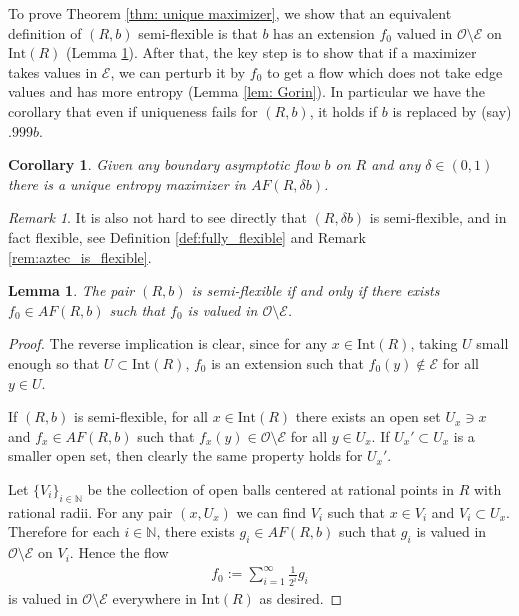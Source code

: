 \documentclass[11pt]{article}
\newtheorem{lemma}[thm]{Lemma}
\newtheorem{cor}[thm]{Corollary}
\theoremstyle{remark}
\newtheorem{rem}[thm]{Remark}
\theoremstyle{definition}
\newcommand{\mc}[1]{\mathcal{#1}}
\newcommand{\m}[1]{\mathbb{#1}}
\begin{document}
To prove Theorem \ref{thm: unique maximizer}, we show that an equivalent definition of $(R,b)$ {semi-flexible} is that $b$ has an extension $f_0$ valued in $\mc O\setminus \mc E$ on $\text{Int}(R)$ (Lemma \ref{lem: nonwhere edge extension}). After that, the key step is to show that if a maximizer takes values in $\mc E$, we can perturb it by $f_0$ to get a flow which does not take edge values and has more entropy (Lemma \ref{lem: Gorin}). In particular we have the corollary that even if uniqueness fails for $(R,b)$, it holds if $b$ is replaced by (say) $.999b$.
\begin{cor}
Given any boundary asymptotic flow $b$ on $R$ and any $\delta\in (0,1)$ there is a unique entropy maximizer in $AF(R, \delta b)$.
\end{cor}
\begin{rem}\label{rem:aztec_is_semiflexible}
    It is also not hard to see directly that $(R,\delta b)$ is semi-flexible, and in fact flexible, see Definition \ref{def:fully_flexible} and Remark \ref{rem:aztec_is_flexible}. 
\end{rem}

\begin{lemma}\label{lem: nonwhere edge extension}
    The pair $(R,b)$ is semi-flexible if and only if there exists $f_0\in AF(R,b)$ such that $f_0$ is valued in $\mc O\setminus \mc E$.
\end{lemma}

\begin{proof}
    The reverse implication is clear, since for any $x\in \text{Int}(R)$, taking $U$ small enough so that $U\subset \text{Int}(R)$, $f_0$ is an extension such that $f_0(y)\not\in \mc E$ for all $y\in U$.
    
    If $(R,b)$ is semi-flexible, for all $x\in \text{Int}(R)$ there exists an open set $U_x\ni x$ and $f_x\in AF(R,b)$ such that $f_x(y) \in \mc O\setminus \mc E$ for all $y\in U_x$. If $U_x'\subset U_x$ is a smaller open set, then clearly the same property holds for $U_x'$.
    
    Let $\{V_i\}_{i\in \m N}$ be the collection of open balls centered at rational points in $R$ with rational radii. For any pair $(x,U_x)$ we can find $V_i$ such that $x\in V_i$ and $V_i\subset U_x$. Therefore for each $i\in \m N$, there exists $g_i \in AF(R,b)$ such that $g_i$ is valued in $\mc O\setminus \mc E$ on $V_i$. Hence the flow 
    \begin{align*}
        f_0 := \sum_{i=1}^\infty \frac{1}{2^i} g_i
    \end{align*}
    is valued in $\mc O\setminus \mc E$ everywhere in $\text{Int}(R)$ as desired.
\end{proof}
\end{document}

